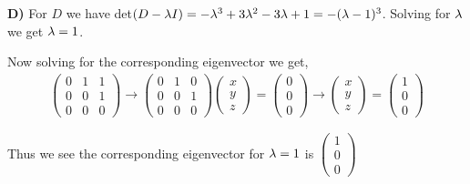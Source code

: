 \documentclass[12pt]{article}
\begin{document}
    \textbf{D)} For $D$ we have det$(D - \lambda I) = -{\lambda}^3 + 3{\lambda}^2 - 3{\lambda} +1 = -({\lambda} -1)^3$. Solving for ${\lambda}$ we get ${\lambda} = 1$.

    Now solving for the corresponding eigenvector we get,
    \begin{align*}
        \begin{pmatrix}
            0 & 1 & 1 \\
            0 & 0 & 1 \\
            0 & 0 & 0
            \end{pmatrix} \rightarrow \begin{pmatrix}
                0 & 1 & 0 \\ 0 & 0 & 1 \\ 0 & 0 &0 
            \end{pmatrix} \begin{pmatrix}
                x \\ y \\ z
            \end{pmatrix} = \begin{pmatrix}
                0 \\ 0\\ 0
            \end{pmatrix} \rightarrow \begin{pmatrix}
                x \\ y \\ z 
            \end{pmatrix} = \begin{pmatrix}
                1 \\ 0 \\ 0
            \end{pmatrix}
    \end{align*}

    Thus we see the corresponding eigenvector for ${\lambda} = 1$ is $\begin{pmatrix}
        1 \\ 0 \\ 0
    \end{pmatrix}$
\end{document}

